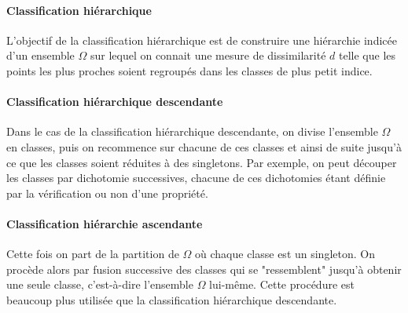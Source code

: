 \documentclass{report}
\begin{document}
\paragraph{Classification hiérarchique}
L'objectif de la classification hiérarchique est de construire une hiérarchie indicée d'un ensemble $\Omega$ sur lequel on connait une mesure de dissimilarité $d$ telle que les points les plus proches soient regroupés dans les classes de plus petit indice.
\paragraph{Classification hiérarchique descendante}
Dans le cas de la classification hiérarchique descendante, on divise l'ensemble $\Omega$ en classes, puis on recommence sur chacune de ces classes et ainsi de suite jusqu'à ce que les classes soient réduites à des singletons. Par exemple, on peut découper les classes par dichotomie successives, chacune de ces dichotomies étant définie par la vérification ou non d'une propriété.
\paragraph{Classification hiérarchie ascendante}
Cette fois on part de la partition de $\Omega$ où chaque classe est un singleton. On procède alors par fusion successive des classes qui se "ressemblent" jusqu'à obtenir une seule classe, c'est-à-dire l'ensemble $\Omega$ lui-même. Cette procédure est beaucoup plus utilisée que la classification hiérarchique descendante.
\end{document}
